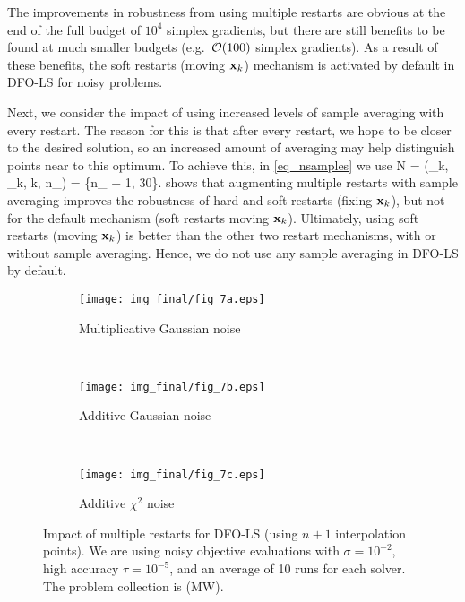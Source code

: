The improvements in robustness from using multiple restarts are obvious at the end of the full budget of $10^4$ simplex gradients, but there are still benefits to be found at much smaller budgets (e.g.~$\mathcal{O}(100)$ simplex gradients).
As a result of these benefits, the soft restarts (moving $\mathbf{x}_k$) mechanism is activated by default in DFO-LS for noisy problems.

Next, we consider the impact of using increased levels of sample averaging with every restart.
The reason for this is that after every restart, we hope to be closer to the desired solution, so an increased amount of averaging may help distinguish points near to this optimum.
To achieve this, in \eqref{eq_nsamples} we use
\be N = (\rho_k, \Delta_k, k, n_{}) = \min\{n_{} + 1, 30\}. \ee
{} shows that 
 augmenting multiple restarts with sample averaging improves the robustness of hard and soft restarts (fixing $\mathbf{x}_k$), but not for the default mechanism (soft restarts moving $\mathbf{x}_k$).
Ultimately, using soft restarts (moving $\mathbf{x}_k$) is better than the other two restart mechanisms, with or without sample averaging.
Hence, we do not use any sample averaging in DFO-LS by default.

\begin{figure}[t]
	\centering
	\begin{subfigure}[b]{0.48\textwidth}
		\texttt{[image: img\_final/fig\_7a.eps]}
		\caption{Multiplicative Gaussian noise}
		\label{fig_restarts_noise2_ubgsn_noisyf}
	\end{subfigure}
	~
	\begin{subfigure}[b]{0.48\textwidth}
		\texttt{[image: img\_final/fig\_7b.eps]}
		\caption{Additive Gaussian noise}
		\label{fig_restarts_noise2_addgsn_noisyf}
	\end{subfigure}
	\\
	\begin{subfigure}[b]{0.48\textwidth}
		\texttt{[image: img\_final/fig\_7c.eps]}
		\caption{Additive $\chi^2$ noise}
		\label{fig_restarts_noise2_addchisq_noisyf}
	\end{subfigure}
	\caption{Impact of multiple restarts for DFO-LS (using $n+1$ interpolation points). We are using noisy objective evaluations with $\sigma=10^{-2}$, high accuracy $\tau=10^{-5}$, and an average of 10 runs for each solver. The problem collection is (MW).}
	\label{fig_restarts_noise2}
\end{figure}

